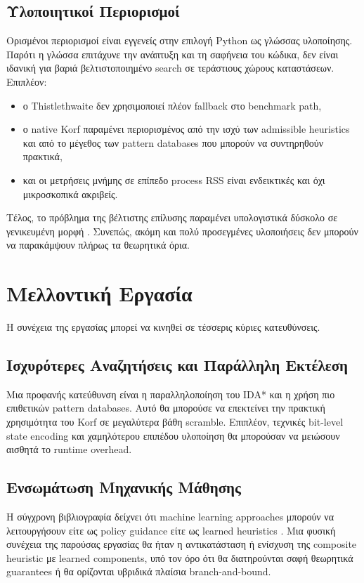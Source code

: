 \subsection{Υλοποιητικοί Περιορισμοί}

Ορισμένοι περιορισμοί είναι εγγενείς στην επιλογή Python ως γλώσσας υλοποίησης. Παρότι η γλώσσα επιτάχυνε την ανάπτυξη και τη σαφήνεια του κώδικα, δεν είναι ιδανική για βαριά βελτιστοποιημένο search σε τεράστιους χώρους καταστάσεων. Επιπλέον:
\begin{itemize}
    \item ο Thistlethwaite δεν χρησιμοποιεί πλέον fallback στο benchmark path,
    \item ο native Korf παραμένει περιορισμένος από την ισχύ των admissible heuristics και από το μέγεθος των pattern databases που μπορούν να συντηρηθούν πρακτικά,
    \item και οι μετρήσεις μνήμης σε επίπεδο process RSS είναι ενδεικτικές και όχι μικροσκοπικά ακριβείς.
\end{itemize}

Τέλος, το πρόβλημα της βέλτιστης επίλυσης παραμένει υπολογιστικά δύσκολο σε γενικευμένη μορφή \cite{demaine2018npcomplete}. Συνεπώς, ακόμη και πολύ προσεγμένες υλοποιήσεις δεν μπορούν να παρακάμψουν πλήρως τα θεωρητικά όρια.

\section{Μελλοντική Εργασία}

Η συνέχεια της εργασίας μπορεί να κινηθεί σε τέσσερις κύριες κατευθύνσεις.

\subsection{Ισχυρότερες Αναζητήσεις και Παράλληλη Εκτέλεση}

Μια προφανής κατεύθυνση είναι η παραλληλοποίηση του IDA* και η χρήση πιο επιθετικών pattern databases. Αυτό θα μπορούσε να επεκτείνει την πρακτική χρησιμότητα του Korf σε μεγαλύτερα βάθη scramble. Επιπλέον, τεχνικές bit-level state encoding και χαμηλότερου επιπέδου υλοποίηση θα μπορούσαν να μειώσουν αισθητά το runtime overhead.

\subsection{Ενσωμάτωση Μηχανικής Μάθησης}

Η σύγχρονη βιβλιογραφία δείχνει ότι machine learning approaches μπορούν να λειτουργήσουν είτε ως policy guidance είτε ως learned heuristics \cite{agostinelli2019deepcubea,takano2023efficientcube}. Μια φυσική συνέχεια της παρούσας εργασίας θα ήταν η αντικατάσταση ή ενίσχυση της composite heuristic με learned components, υπό τον όρο ότι θα διατηρούνται σαφή θεωρητικά guarantees ή θα ορίζονται υβριδικά πλαίσια branch-and-bound.

